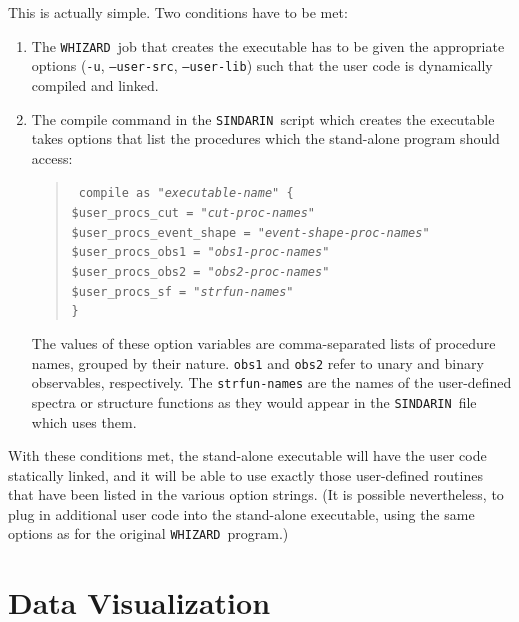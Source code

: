 \documentclass[12pt]{book}
\newcommand{\ttt}[1]{\texttt{#1}}
\newcommand{\whizard}{\texttt{WHIZARD}}
\newcommand{\sindarin}{\texttt{SINDARIN}}
\begin{document}
This is actually simple.  Two conditions have to be met:
\begin{enumerate}
\item
  The \whizard\ job that creates the executable has to be given the appropriate
  options (\ttt{-u}, \ttt{--user-src}, \ttt{--user-lib}) such that
  the user code is dynamically compiled and linked.
\item 
  The compile command in the \sindarin\ script which creates the
  executable takes options that list the procedures which the
  stand-alone program should access:
  \begin{quote}
    \begin{footnotesize}
\ttt{%
compile as "\emph{executable-name}" \{ \\
\hspace*{2em}  \$user\_procs\_cut          = "\emph{cut-proc-names}"\\
\hspace*{2em}  \$user\_procs\_event\_shape = "\emph{event-shape-proc-names}"\\
\hspace*{2em}  \$user\_procs\_obs1         = "\emph{obs1-proc-names}"\\
\hspace*{2em}  \$user\_procs\_obs2         = "\emph{obs2-proc-names}"\\
\hspace*{2em}  \$user\_procs\_sf           = "\emph{strfun-names}"\\
\}}
    \end{footnotesize}
  \end{quote}
  The values of these option variables are comma-separated lists of procedure
  names, grouped by their nature.  \ttt{obs1} and \ttt{obs2} refer to unary
  and binary observables, respectively.  The \ttt{strfun-names} are
  the names of the user-defined spectra or structure functions as they
  would appear in the \sindarin\ file which uses them.
\end{enumerate}
With these conditions met, the stand-alone executable will have the
user code statically linked, and it will be able to use exactly those
user-defined routines that have been listed in the various option
strings.  (It is possible nevertheless, to plug in additional user code
into the stand-alone executable, using the same options as for the
original \whizard\ program.) 

\chapter{Data Visualization}
\label{sec:visualization}
\end{document}
